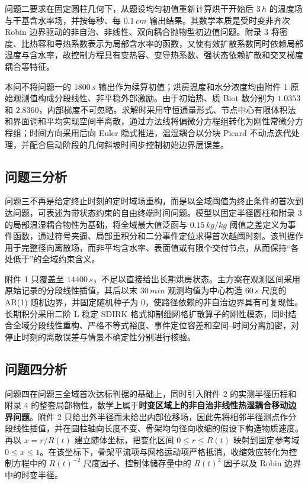 \documentclass[withoutpreface,bwprint]{cumcmthesis}
\begin{document}
问题二要求在固定圆柱几何下，从题设均匀初值重新计算烘干开始后 $3\,\si{h}$ 的温度场与干基含水率场，并按每秒、每 $0.1\,\si{cm}$ 输出结果。其数学本质是受时变非齐次 Robin 边界驱动的非自治、非线性、双向耦合抛物型初边值问题。附录 3 将密度、比热容和导热系数表示为局部含水率的函数，又使有效扩散系数同时依赖局部温度与含水率，故控制方程具有变热容、变导热系数、强状态依赖扩散和交叉梯度耦合等特征。

本问不将问题一的 $1800\,\si{s}$ 输出作为续算初值；烘房温度和水分浓度均由附件 1 原始观测值构成分段线性、非平稳外部激励。由于初始热、质 Biot 数分别为 $1.0353$ 和 $2.8360$，内部梯度不可忽略。求解时采用守恒通量形式、节点中心有限体积法和界面调和平均实现空间半离散，通过方法线将偏微分方程组转化为刚性常微分方程组；时间方向采用后向 Euler 隐式推进，温湿耦合以分块 Picard 不动点迭代处理，并配合启动阶段的几何斜坡时间步控制初始边界层误差。

\subsection{问题三分析}

问题三不再是给定终止时刻的定时域场重构，而是以全域阈值为终止条件的首次到达问题，可表述为带状态约束的自由终端时间问题。模型以固定半径圆柱和附录 3 的局部温湿耦合物性为基础，将全域最大值泛函与 $0.15\,\si{kg/kg}$ 阈值之差定义为事件函数，通过符号夹逼、局部重积分和二分事件定位求得首次越阈时刻。该判据作用于完整径向离散场，而非平均含水率、表面值或有限个交付节点，从而保持“各处低于”的全域约束含义。

附件 1 只覆盖至 $14400\,\si{s}$，不足以直接给出长期烘房状态。主方案在观测区间采用原始记录的分段线性插值，其后以末 $30\,\si{min}$ 观测均值为中心构造 $60\,\si{s}$ 尺度的 AR(1) 随机边界，并固定随机种子为 $0$，使路径依赖的非自治边界具有可复现性。长期积分采用二阶 L 稳定 SDIRK 格式抑制细网格扩散算子的刚性模态，同时结合全域分段线性重构、严格不等式裕度、事件定位容差和空间--时间分离加密，对停止时刻的离散误差与情景不确定性分别进行核验。

\subsection{问题四分析}

问题四在问题三全域首次达标判据的基础上，同时引入附件 2 的实测半径历程和附录 4 的整套局部物性，数学上属于\textbf{时变区域上的非自治非线性热湿耦合移动边界问题}。附件 2 只给出外半径而未给出内部位移场，因此先将相邻半径测点作分段线性插值，并在圆柱轴向长度不变、骨架均匀径向收缩的假设下构造物质速度。再以 $x=r/R(t)$ 建立随体坐标，把变化区间 $0\le r\le R(t)$ 映射到固定参考域 $0\le x\le1$。在该坐标下，骨架平流项与网格运动项严格抵消，收缩效应转化为控制方程中的 $R(t)^{-2}$ 尺度因子、控制体储存量中的 $R(t)^2$ 因子以及 Robin 边界中的时变半径。
\end{document}
